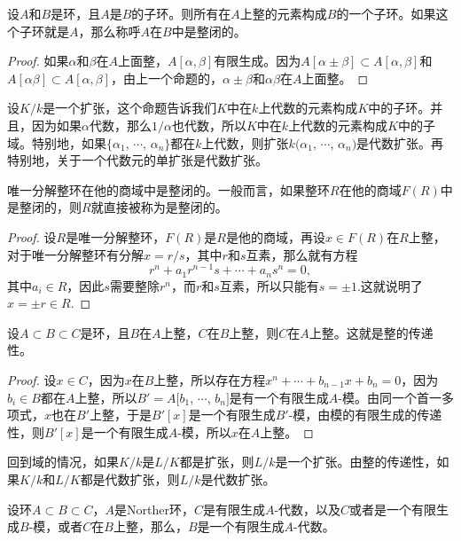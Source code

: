 \para \label{iope}设$A$和$B$是环，且$A$是$B$的子环。则所有在$A$上整的元素构成$B$的一个子环。如果这个子环就是$A$，那么称呼$A$在$B$中是整闭的。

\begin{proof} 如果$\alpha$和$\beta$在$A$上面整，$A[\alpha,\beta]$有限生成。因为$A[\alpha\pm\beta]\subset A[\alpha,\beta]$和$A[\alpha\beta]\subset A[\alpha,\beta]$，由上一个命题的，$\alpha\pm\beta$和$\alpha\beta$在$A$上面整。\end{proof}

设$K/k$是一个扩张，这个命题告诉我们$K$中在$k$上代数的元素构成$K$中的子环。并且，因为如果$\alpha$代数，那么$1/\alpha$也代数，所以$K$中在$k$上代数的元素构成$K$中的子域。特别地，如果$\{\alpha_1$, $\cdots$, $\alpha_n\}$都在$k$上代数，则扩张$k(\alpha_1$, $\cdots$, $\alpha_n)$是代数扩张。再特别地，关于一个代数元的单扩张是代数扩张。

\para 唯一分解整环在他的商域中是整闭的。一般而言，如果整环$R$在他的商域$F(R)$中是整闭的，则$R$就直接被称为是整闭的。

\begin{proof} 
	设$R$是唯一分解整环，$F(R)$是$R$是他的商域，再设$x\in F(R)$在$R$上整，对于唯一分解整环有分解$x=r/s$，其中$r$和$s$互素，那么就有方程
	\[
		r^n+a_1r^{n-1}s+\cdots+a_n s^n=0,
	\]
	其中$a_i\in R$，因此$s$需要整除$r^n$，而$r$和$s$互素，所以只能有$s=\pm 1$.这就说明了$x=\pm r\in R$.
\end{proof}

\begin{pro}
设$A\subset B\subset C$是环，且$B$在$A$上整，$C$在$B$上整，则$C$在$A$上整。这就是整的传递性。
\end{pro}

\begin{proof} 
	设$x\in C$，因为$x$在$B$上整，所以存在方程$x^n+\cdots+b_{n-1}x+b_n=0$，因为$b_i\in B$都在$A$上整，所以$B'=A[b_1$, $\cdots$, $b_n]$是有一个有限生成$A$-模。由同一个首一多项式，$x$也在$B'$上整，于是$B'[x]$是一个有限生成$B'$-模，由模的有限生成的传递性，则$B'[x]$是一个有限生成$A$-模，所以$x$在$A$上整。
\end{proof}

回到域的情况，如果$K/k$是$L/K$都是扩张，则$L/k$是一个扩张。由整的传递性，如果$K/k$和$L/K$都是代数扩张，则$L/k$是代数扩张。

\begin{pro}\label{p:2.4}
设环$A\subset B\subset C$，$A$是Norther环，$C$是有限生成$A$-代数，以及$C$或者是一个有限生成$B$-模，或者$C$在$B$上整，那么，$B$是一个有限生成$A$-代数。
\end{pro}

